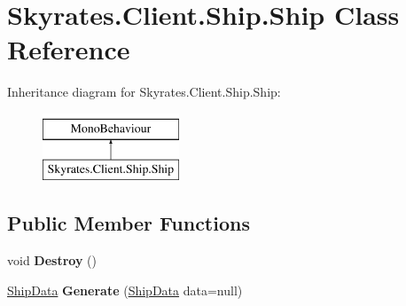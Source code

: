 \hypertarget{class_skyrates_1_1_client_1_1_ship_1_1_ship}{\section{Skyrates.\-Client.\-Ship.\-Ship Class Reference}
\label{class_skyrates_1_1_client_1_1_ship_1_1_ship}
}
Inheritance diagram for Skyrates.\-Client.\-Ship.\-Ship\-:\begin{figure}[H]
\begin{center}
\leavevmode
\includegraphics[height=2.000000cm]{class_skyrates_1_1_client_1_1_ship_1_1_ship}
\end{center}
\end{figure}
\subsection*{Public Member Functions}
\begin{DoxyCompactItemize}
\item 
\hypertarget{class_skyrates_1_1_client_1_1_ship_1_1_ship_a0e10ad8211decc8c7bbb4c9ff49c3e17}{void {\bfseries Destroy} ()}\label{class_skyrates_1_1_client_1_1_ship_1_1_ship_a0e10ad8211decc8c7bbb4c9ff49c3e17}

\item 
\hypertarget{class_skyrates_1_1_client_1_1_ship_1_1_ship_a7a3883a1d416125cad765f729398bddb}{\hyperlink{class_ship_data}{Ship\-Data} {\bfseries Generate} (\hyperlink{class_ship_data}{Ship\-Data} data=null)}\label{class_skyrates_1_1_client_1_1_ship_1_1_ship_a7a3883a1d416125cad765f729398bddb}

\end{DoxyCompactItemize}
